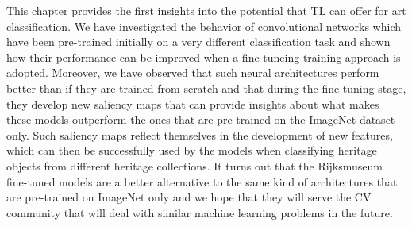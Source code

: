 This chapter provides the first insights into the potential that TL can offer for art classification. We have investigated the behavior of convolutional networks which have been pre-trained initially on a very different classification task and shown how their performance can be improved when a fine-tuneing training approach is adopted. Moreover, we have observed that such neural architectures perform better than if they are trained from scratch and that during the fine-tuning stage, they develop new saliency maps that can provide insights about what makes these models outperform the ones that are pre-trained on the ImageNet dataset only. Such saliency maps reflect themselves in the development of new features, which can then be successfully used by the models when classifying heritage objects from different heritage collections. It turns out that the Rijksmuseum fine-tuned models are a better alternative to the same kind of architectures that are pre-trained on ImageNet only and we hope that they will serve the CV community that will deal with similar machine learning problems in the future.

